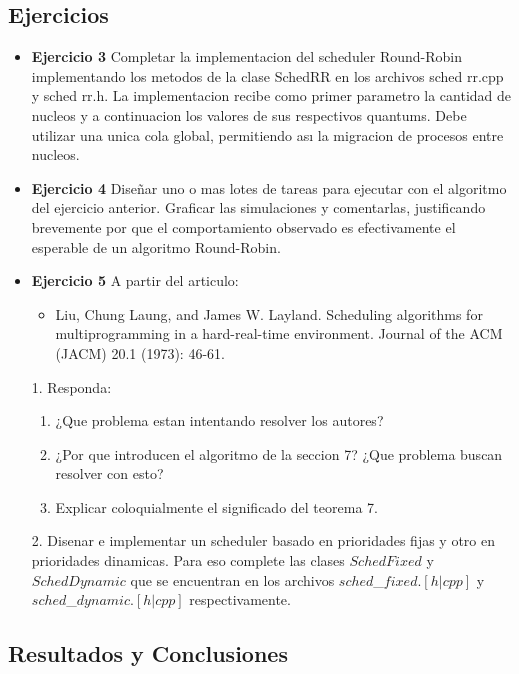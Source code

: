 
\subsection{Ejercicios}
\begin{itemize}
 \item 
\textbf{Ejercicio 3}  Completar la implementacion del scheduler Round-Robin implementando los
metodos de la clase SchedRR en los archivos sched rr.cpp y sched rr.h. La implementacion
recibe como primer parametro la cantidad de nucleos y a continuacion los valores de sus
respectivos quantums. Debe utilizar una unica cola global, permitiendo ası la migracion de
procesos entre nucleos.
\item \textbf{Ejercicio 4} Diseñar uno o mas lotes de tareas para ejecutar con el algoritmo del ejercicio
anterior. Graficar las simulaciones y comentarlas, justificando brevemente por que el comportamiento 
observado es efectivamente el esperable de un algoritmo Round-Robin.
\item \textbf{Ejercicio 5} A partir del articulo:\\
\begin{itemize}
 \item Liu, Chung Laung, and James W. Layland. Scheduling algorithms for multiprogramming
in a hard-real-time environment. Journal of the ACM (JACM) 20.1 (1973): 46-61.
\end{itemize}
1. Responda:
\begin{enumerate}
 \item ¿Que problema estan intentando resolver los autores?
 \item ¿Por que introducen el algoritmo de la seccion 7? ¿Que problema buscan resolver
con esto?
\item Explicar coloquialmente el significado del teorema 7.
\end{enumerate}
2. Disenar e implementar un scheduler basado en prioridades fijas y otro en prioridades
dinamicas. Para eso complete las clases $SchedFixed$ y $SchedDynamic$ que se encuentran
en los archivos $sched$\_$fixed.[h|cpp]$ y $sched$\_$dynamic.[h|cpp]$ respectivamente.
\end{itemize}


\subsection{Resultados y Conclusiones}

